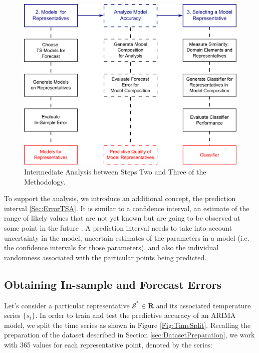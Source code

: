 \begin{figure}[h!]
	\centering
	\includegraphics[scale=0.18]{../Figures/Experiements_Methodology_Step2_Step3}
	\caption{Intermediate Analysis between Steps Two and Three of the Methodology.}
	\label{Fig:MethodologyExperiments}
\end{figure}

To support the analysis, we introduce an additional concept, the prediction interval \ref{Sec:ErrorTSA}. It is  similar to a confidence interval, an estimate of the range of likely values that are not yet known but are going to be observed at some point in the future \cite{Chatfield2001}. A prediction interval needs to take into account uncertainty in the model, uncertain estimates of the parameters in a model (i.e. the confidence intervals for those parameters), and also the individual randomness associated with the particular points being predicted.

\subsection{Obtaining In-sample and Forecast Errors}
\label{sec:InSampleForecastErrors}

Let's consider a particular representative $\mathcal{S}^{*} \in \mathbf{R}$ and its associated temperature series $\lbrace s_t \rbrace$. In order to train and test the predictive accuracy of an ARIMA model, we split the time series as shown in Figure \ref{Fig:TimeSplit}. Recalling the preparation of the dataset described in Section \ref{sec:DatasetPreparation}, we work with 365 values for each representative point, denoted by the series:

